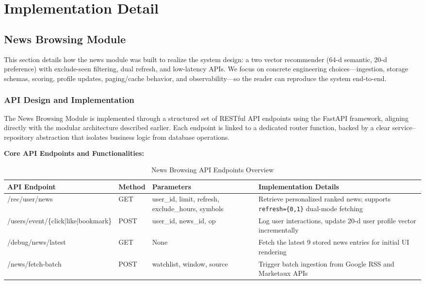 \chapter{Implementation Detail}

\section{News Browsing Module}

This section details how the news module was built to realize the system design: a two vector recommender (64-d semantic, 20-d preference) with exclude-seen filtering, dual refresh, and low-latency APIs. We focus on concrete engineering choices—ingestion, storage schemas, scoring, profile updates, paging/cache behavior, and observability—so the reader can reproduce the system end-to-end.

\subsection{API Design and Implementation}

The News Browsing Module is implemented through a structured set of RESTful API endpoints using the FastAPI framework, aligning directly with the modular architecture described earlier. Each endpoint is linked to a dedicated router function, backed by a clear service–repository abstraction that isolates business logic from database operations.

\textbf{Core API Endpoints and Functionalities:}

\begin{table}[h]
\centering
\caption{News Browsing API Endpoints Overview}
\begin{tabular}{|p{4cm}|p{2.5cm}|p{3.5cm}|p{4cm}|}
\hline
\textbf{API Endpoint} & \textbf{Method} & \textbf{Parameters} & \textbf{Implementation Details} \\
\hline
/rec/user/news & GET & user\_id, limit, refresh, exclude\_hours, symbols & Retrieve personalized ranked news; supports \texttt{refresh=\{0,1\}} dual-mode fetching \\
\hline
/users/event/\{click|like|bookmark\} & POST & user\_id, news\_id, op & Log user interactions, update 20-d user profile vector incrementally \\
\hline
/debug/news/latest & GET & None & Fetch the latest 9 stored news entries for initial UI rendering \\
\hline
/news/fetch-batch & POST & watchlist, window, source & Trigger batch ingestion from Google RSS and Marketaux APIs \\
\hline
\end{tabular}
\end{table}

